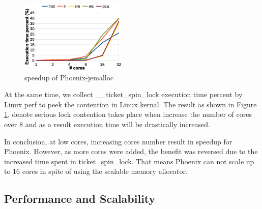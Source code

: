 \begin{figure}[!h!t]  
	\centering
	\includegraphics[width=0.45\textwidth]{eps/phoenix_spinlock_jemalloc.eps}
	\caption{speedup of Phoenix-jemalloc}
	\label{fig:phoenix:spinlock:jemalloc}
\end{figure}
At the same time, we collect \_\_ticket\_spin\_lock execution time percent by Linux perf to peek the contention in Linux kernal.
The result as shown in Figure \ref{fig:phoenix:spinlock:jemalloc}, denote serious lock contention takes place when increase the number of cores over 8 and as a result execution time will be drastically increased.

In conclusion, at low cores, increasing cores number result in speedup for Phoenix.
However, as more cores were added, the benefit was reversed due to the increased time spent in ticket\_spin\_lock.
That means Phoenix can not scale up to 16 cores in spite of using the scalable memory allocator.


\subsection{Performance and Scalability}


